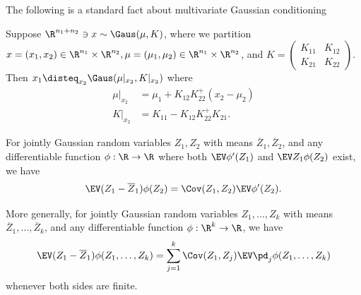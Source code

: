 \documentclass[main.tex]{subfiles}
\begin{document}
The following is a standard fact about multivariate Gaussian conditioning
\begin{prop}\label{prop:GaussianCondition}
Suppose $\R^{n_1 + n_2} \ni x \sim \Gaus(\mu, K)$, where we partition $x = (x_1, x_2) \in \R^{n_1} \times \R^{n_2}, \mu = (\mu_1, \mu_2) \in \R^{n_1} \times \R^{n_2}$, and $K = \begin{pmatrix} K_{11} & K_{12}\\ K_{21} & K_{22}\end{pmatrix}$.
Then
$x_1 \disteq_{x_2} \Gaus(\mu|_{x_2}, K|_{x_2})$
where
\begin{align*}
    \mu|_{x_2}
        &=
            \mu_1 + K_{12} K_{22}^+ (x_2 - \mu_2)\\
    K|_{x_2}
        &=
            K_{11} - K_{12} K_{22}^+ K_{21}.
\end{align*}

\end{prop}

\begin{lemma}\label{lemma:stein}
For jointly Gaussian random variables $Z_1, Z_2$ with means $\overline Z_1, \overline Z_2$, and any differentiable function $\phi: \R \to \R$ where both $\EV \phi'(Z_1)$ and $\EV Z_1 \phi(Z_2)$ exist, we have
\[\EV (Z_1 - \overline Z_1) \phi(Z_2) = \Cov(Z_1, Z_2) \EV \phi'(Z_2).\]

More generally, for jointly Gaussian random variables $Z_1,\ldots, Z_k$ with means $\overline Z_1, \ldots, \overline Z_k$, and any differentiable function $\phi: \R^k \to \R$, we have
\[\EV (Z_1 - \overline Z_1) \phi(Z_1, \ldots, Z_k) =
\sum_{j=1}^k \Cov(Z_1, Z_j) \EV \pd_j \phi(Z_1, \ldots, Z_k)\]
whenever both sides are finite.
\end{lemma}
\end{document}
